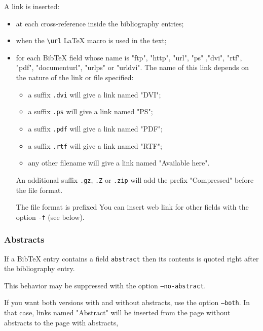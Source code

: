 \documentclass[11pt,a4paper]{article}
\begin{document}
A link is inserted:
\begin{itemize}

\item  at each cross-reference inside the bibliography entries; 

\item  when the \verb|\url| LaTeX macro is used in the text; 

\item  for each BibTeX field whose name is "ftp", "http", "url", "ps"
  ,"dvi", "rtf", "pdf",
  "documenturl", "urlps" or "urldvi". The name of this link depends on
  the nature of the link or file specified: 
  \begin{itemize}
  \item a suffix \texttt{.dvi} will give a link named "DVI";
  \item a suffix \texttt{.ps} will give a link named "PS";
  \item a suffix \texttt{.pdf} will give a link named "PDF";
  \item a suffix \texttt{.rtf} will give a link named "RTF";
  \item any other filename will give a link named "Available here".
  \end{itemize}
  
  An additional suffix \texttt{.gz}, \texttt{.Z} or
  \texttt{.zip} will add the prefix "Compressed" before the
  file format.

  The file format is prefixed 
  You can insert web link for other fields with the option
  \texttt{-f} (see below).
  
\end{itemize}



\subsubsection{Abstracts}

If a BibTeX entry contains a field \texttt{abstract} then its contents
is quoted right after the bibliography entry.

This behavior may be suppressed with the option \texttt{--no-abstract}.

If you want both versions with and without abstracts, use the option
\texttt{--both}. In that case, links named "Abstract" will be
inserted from the page without abstracts to the page with abstracts,
\end{document}
